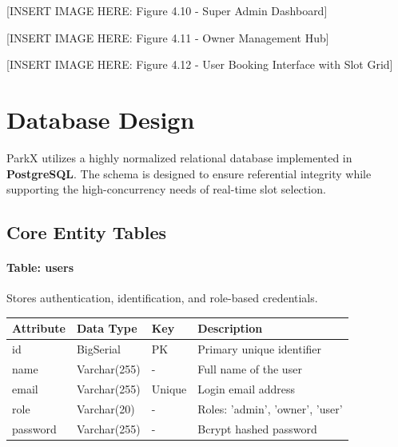\vspace{0.5cm}
[INSERT IMAGE HERE: Figure 4.10 - Super Admin Dashboard]
\vspace{0.5cm}

\vspace{0.5cm}
[INSERT IMAGE HERE: Figure 4.11 - Owner Management Hub]
\vspace{0.5cm}

\vspace{0.5cm}
[INSERT IMAGE HERE: Figure 4.12 - User Booking Interface with Slot Grid]
\vspace{0.5cm}

\section{Database Design}
ParkX utilizes a highly normalized relational database implemented in \textbf{PostgreSQL}. The schema is designed to ensure referential integrity while supporting the high-concurrency needs of real-time slot selection.

\newpage
\subsection{Core Entity Tables}

\paragraph{Table: \textbf{users}}
Stores authentication, identification, and role-based credentials.
\begin{longtable}{|p{3cm}|p{3cm}|p{2cm}|p{6cm}|}
    \hline
    \textbf{Attribute} & \textbf{Data Type} & \textbf{Key} & \textbf{Description} \\
    \hline
    \endhead
    id & BigSerial & PK & Primary unique identifier \\
    \hline
    name & Varchar(255) & - & Full name of the user \\
    \hline
    email & Varchar(255) & Unique & Login email address \\
    \hline
    role & Varchar(20) & - & Roles: 'admin', 'owner', 'user' \\
    \hline
    password & Varchar(255) & - & Bcrypt hashed password \\
    \hline
\end{longtable}

